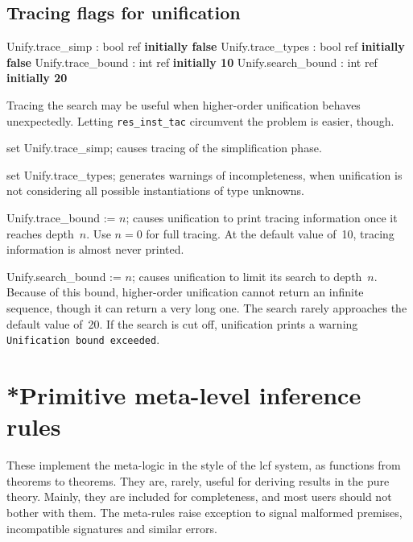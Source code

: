 \subsection{Tracing flags for unification}
\begin{ttbox} 
Unify.trace_simp   : bool ref \hfill{\bf initially false}
Unify.trace_types  : bool ref \hfill{\bf initially false}
Unify.trace_bound  : int ref \hfill{\bf initially 10}
Unify.search_bound : int ref \hfill{\bf initially 20}
\end{ttbox}
Tracing the search may be useful when higher-order unification behaves
unexpectedly.  Letting {\tt res_inst_tac} circumvent the problem is easier,
though.
\begin{ttdescription}
\item[set Unify.trace_simp;] 
causes tracing of the simplification phase.

\item[set Unify.trace_types;] 
generates warnings of incompleteness, when unification is not considering
all possible instantiations of type unknowns.

\item[Unify.trace_bound := $n$;] 
causes unification to print tracing information once it reaches depth~$n$.
Use $n=0$ for full tracing.  At the default value of~10, tracing
information is almost never printed.

\item[Unify.search_bound := $n$;] causes unification to limit its
  search to depth~$n$.  Because of this bound, higher-order
  unification cannot return an infinite sequence, though it can return
  a very long one.  The search rarely approaches the default value
  of~20.  If the search is cut off, unification prints a warning
  \texttt{Unification bound exceeded}.
\end{ttdescription}


\section{*Primitive meta-level inference rules}
These implement the meta-logic in the style of the {\sc lcf} system,
as functions from theorems to theorems.  They are, rarely, useful for
deriving results in the pure theory.  Mainly, they are included for
completeness, and most users should not bother with them.  The
meta-rules raise exception  to signal malformed premises,
incompatible signatures and similar errors.


